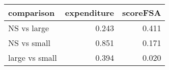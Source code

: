 \begin{table}[!h]
\centering
\begin{tabular}[t]{lrr}
\toprule
comparison & expenditure & scoreFSA\\
\midrule
NS vs large & 0.243 & 0.411\\
NS vs small & 0.851 & 0.171\\
large vs small & 0.394 & 0.020\\
\bottomrule
\end{tabular}
\end{table}
